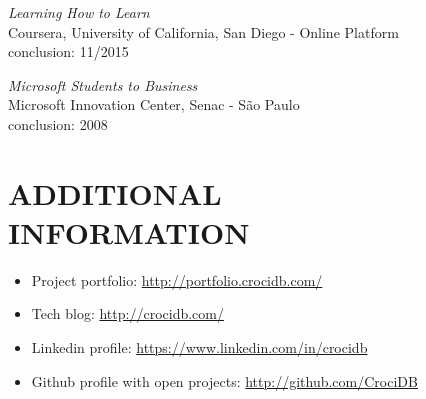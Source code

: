 \documentclass[line,margin]{res}
\begin{document}
\begin{resume}
		   {\sl Learning How to Learn} \\
			Coursera, University of California, San Diego - Online Platform\\
			conclusion: 11/2015
		
           {\sl Microsoft Students to Business} \\
                Microsoft Innovation Center, Senac - São Paulo \\
                conclusion: 2008 

\section{ADDITIONAL \\ INFORMATION}
            \begin{itemize}  \itemsep 1pt
	    	\item Project portfolio: \href{http://portfolio.crocidb.com/}{http://portfolio.crocidb.com/}
	    	\item Tech blog: \href{http://crocidb.com/}{http://crocidb.com/}
            \item Linkedin profile: \href{https://www.linkedin.com/in/crocidb}{https://www.linkedin.com/in/crocidb}
            \item Github profile with open projects: \href{http://github.com/CrociDB}{http://github.com/CrociDB}
            \end{itemize} 

\end{resume}
\end{document}
